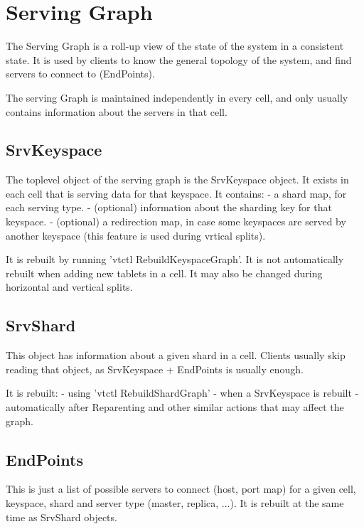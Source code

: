 \section{Serving Graph}\hypertarget{serving-graph}{}\label{serving-graph}

The Serving Graph is a roll-up view of the state of the system in a consistent state. It is used by clients to know
the general topology of the system, and find servers to connect to (EndPoints).

The serving Graph is maintained independently in every cell, and only usually contains information about the servers
in that cell.

\subsection{SrvKeyspace}\hypertarget{srvkeyspace}{}\label{srvkeyspace}

The toplevel object of the serving graph is the SrvKeyspace object. It exists in each cell that is serving data for
that keyspace. It contains:
- a shard map, for each serving type.
- (optional) information about the sharding key for that keyspace.
- (optional) a redirection map, in case some keyspaces are served by another keyspace (this feature is used during
vrtical splits).

It is rebuilt by running 'vtctl RebuildKeyspaceGraph'. It is not automatically rebuilt when adding new tablets in a cell.
It may also be changed during horizontal and vertical splits.

\subsection{SrvShard}\hypertarget{srvshard}{}\label{srvshard}

This object has information about a given shard in a cell. Clients usually skip reading that object, as SrvKeyspace + EndPoints
is usually enough.

It is rebuilt:
- using 'vtctl RebuildShardGraph'
- when a SrvKeyspace is rebuilt
- automatically after Reparenting and other similar actions that may affect the graph.

\subsection{EndPoints}\hypertarget{endpoints}{}\label{endpoints}

This is just a list of possible servers to connect (host, port map) for a given cell, keyspace, shard and server type
(master, replica, ...). It is rebuilt at the same time as SrvShard objects.

